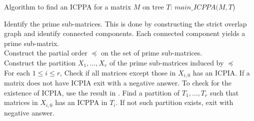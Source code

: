 \documentclass{llncs}
\begin{document}
\begin{algorithm}[h]
\caption{Algorithm to find an ICPPA for a matrix $M$ on tree $T$: $main\_ICPPA(M, T$)}
\label{al:icppa-main}
\begin{algorithmic}
\STATE Identify the prime sub-matrices. This is done by constructing the strict overlap graph and identify connected components.  Each connected component yields a prime sub-matrix.   \\
\STATE Construct the partial order $\preccurlyeq$ on the set of prime sub-matrices.  \\
\STATE Construct the partition $X_1,\ldots,X_r$ of the  prime
sub-matrices induced by $\preccurlyeq$ \\
\STATE For each $1 \leq i \leq r$, Check if all matrices except those in $X_{i,0}$ has an ICPIA.  If a matrix does not have ICPIA exit with a negative answer.  To check for the existence of ICPIA, use the result in \cite{nsnrs09}.
\STATE  Find a partition of $T_1, \ldots, T_r$ such that matrices in $X_{i,0}$ has an ICPPA in $T_i$.  If not such
partition exists, exit with negative answer.  
\end{algorithmic}
  \end{algorithm}
\end{document}
